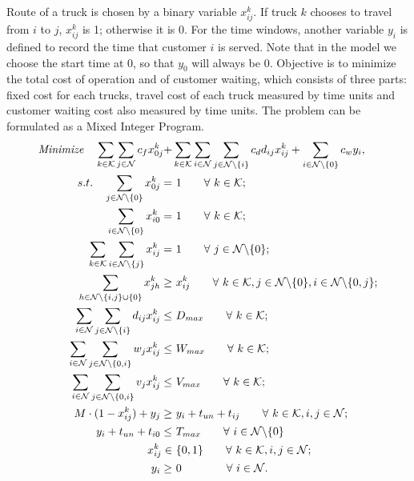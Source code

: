 \documentclass[12pt]{article}
\numberwithin{equation}{section}
\begin{document}
	\paragraph{}Route of a truck is chosen by a binary variable $x_{ij}^k$. If truck $k$ chooses to travel from $i$ to $j$, $x_{ij}^k$ is 1; otherwise it is 0. For the time windows, another variable $y_i$ is defined to record the time that customer $i$ is served. Note that in the model we choose the start time at 0, so that $y_0$ will always be 0. Objective is to minimize the total cost of operation and of customer waiting, which consists of three parts: fixed cost for each trucks, travel cost of each truck measured by time units and customer waiting cost also measured by time units. The problem can be formulated as a Mixed Integer Program.
	\begin{align}
	\text{\emph{Minimize}} \quad  \sum_{k\in \mathcal{K}}\sum_{j\in \mathcal{N}}c_f x^k_{0j}
			+&\sum_{k\in\mathcal{K}}\sum_{i\in \mathcal{N}}\sum_{j\in \mathcal{N}\backslash\{i\}}c_d d_{ij}x^k_{ij} + \sum_{i\in \mathcal{N}\backslash\{0\}}c_w y_i,\\
	s.t. \quad   \sum_{j\in\mathcal{N}\backslash\{0\}}x^k_{0j} =&\  1  \qquad \forall\  k \in \mathcal{K};\\
		 \sum_{i\in\mathcal{N}\backslash\{0\}}x^k_{i0} =&\  1  \qquad \forall\  k \in \mathcal{K};\\
		 \sum_{k\in\mathcal{K}}\sum_{i\in\mathcal{N}\backslash\{j\}}x^k_{ij} =&\  1 \qquad \forall\  j \in \mathcal{N}\backslash\{0\};\\
		 \sum_{h\in\mathcal{N}\backslash\{i,j\}\cup\{0\}}x^k_{jh}\ge&\  x^k_{ij} \qquad \forall\  k \in \mathcal{K}, j \in \mathcal{N}\backslash\{0\}, i\in \mathcal{N}\backslash\{0, j\};\\		
		 \sum_{i\in\mathcal{N}}\sum_{j\in\mathcal{N}\backslash\{i\}}d_{ij}x^k_{ij} \le&\  D_{max} \qquad \forall\  k \in \mathcal{K};\\
		 \sum_{i\in\mathcal{N}}\sum_{j\in\mathcal{N}\backslash\{0,i\}}w_{j}x^k_{ij} \le&\  W_{max} \qquad \forall\  k \in \mathcal{K};\\
		 \sum_{i\in\mathcal{N}}\sum_{j\in\mathcal{N}\backslash\{0,i\}}v_{j}x^k_{ij} \le&\  V_{max} \qquad \forall\  k \in \mathcal{K};\\		
		 M\cdot (1-x^k_{ij}) + y_{j} \ge&\  y_i + t_{un} + t_{ij} \qquad \forall\  k \in \mathcal{K}, i, j\in \mathcal{N};\\
		 y_i + t_{un} + t_{i0} \le&\  T_{max} \qquad \forall\  i\in \mathcal{N}\backslash\{0\}\\
		 x^k_{ij} \in&\  \{0,1\} \qquad \forall\  k\in \mathcal{K},i, j\in \mathcal{N};\\
		 y_i \ge&\  0 \qquad \qquad \forall\  i\in \mathcal{N}.
	\end{align}
	
\end{document}

